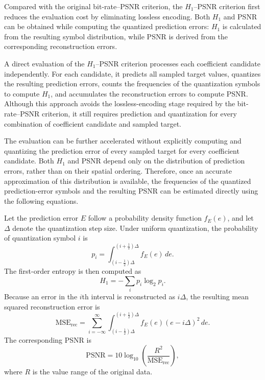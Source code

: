 Compared with the original bit-rate--PSNR criterion, the $H_1$--PSNR criterion first reduces the evaluation cost by eliminating lossless encoding. Both $H_1$ and PSNR can be obtained while computing the quantized prediction errors: $H_1$ is calculated from the resulting symbol distribution, while PSNR is derived from the corresponding reconstruction errors.

A direct evaluation of the $H_1$--PSNR criterion processes each coefficient candidate independently. For each candidate, it predicts all sampled target values, quantizes the resulting prediction errors, counts the frequencies of the quantization symbols to compute $H_1$, and accumulates the reconstruction errors to compute PSNR. Although this approach avoids the lossless-encoding stage required by the bit-rate--PSNR criterion, it still requires prediction and quantization for every combination of coefficient candidate and sampled target.

The evaluation can be further accelerated without explicitly computing and quantizing the prediction error of every sampled target for every coefficient candidate. Both $H_1$ and PSNR depend only on the distribution of prediction errors, rather than on their spatial ordering. Therefore, once an accurate approximation of this distribution is available, the frequencies of the quantized prediction-error symbols and the resulting PSNR can be estimated directly using the following equations.

Let the prediction error $E$ follow a probability density function $f_E(e)$, and let $\Delta$ denote the quantization step size. Under uniform quantization, the probability of quantization symbol $i$ is
\begin{equation}
p_i=\int_{\left(i-\frac{1}{2}\right)\Delta}^{\left(i+\frac{1}{2}\right)\Delta}f_E(e)\,de.
\end{equation}
The first-order entropy is then computed as
\begin{equation}
H_1=-\sum_i p_i\log_2p_i.
\end{equation}
Because an error in the $i$th interval is reconstructed as $i\Delta$, the resulting mean squared reconstruction error is
\begin{equation}
\mathrm{MSE}_{\mathrm{rec}}=\sum_{i=-\infty}^{\infty}\int_{\left(i-\frac{1}{2}\right)\Delta}^{\left(i+\frac{1}{2}\right)\Delta}f_E(e)\left(e-i\Delta\right)^2\,de.
\end{equation}
The corresponding PSNR is
\begin{equation}
\mathrm{PSNR}=10\log_{10}\left(\frac{R^2}{\mathrm{MSE}_{\mathrm{rec}}}\right),
\end{equation}
where $R$ is the value range of the original data.


